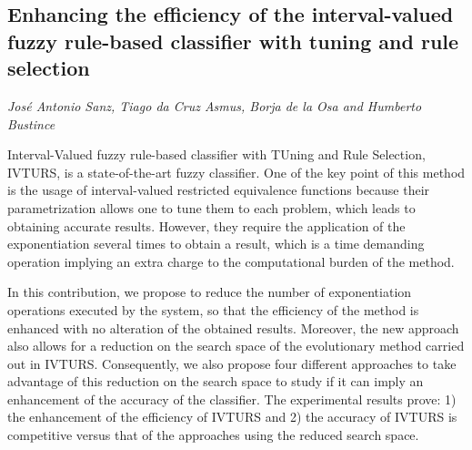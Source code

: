 \documentclass[../booklet.tex]{subfiles}
\begin{document}
\subsection[Enhancing the efficiency of the interval-valued fuzzy rule-based classifier with tuning and rule selection. {\it José Antonio Sanz, Tiago da Cruz Asmus, Borja de la Osa and Humberto Bustince}]{Enhancing the efficiency of the interval-valued fuzzy rule-based classifier with tuning and rule selection}
   

\begin{center}
  {\it José Antonio Sanz, Tiago da Cruz Asmus, Borja de la Osa and Humberto Bustince}
\end{center}

\vskip 0.8cm



Interval-Valued fuzzy rule-based classifier with TUning and Rule Selection, IVTURS, is a state-of-the-art fuzzy classifier.  One of the key point of this method is the usage of interval-valued restricted equivalence functions because their parametrization allows one to tune them to each problem, which leads to obtaining accurate results. However, they require the application of the exponentiation several times to obtain a result, which is a time demanding operation implying an extra charge to the computational burden of the method. 

In this contribution, we propose to reduce the number of exponentiation operations executed by the system, so that the efficiency of the method is enhanced with no alteration of the obtained results. Moreover, the new approach also allows for a reduction on the search space of the evolutionary method carried out in IVTURS. Consequently, we also propose four different approaches to take advantage of this reduction on the search space to study if it can imply an enhancement of the accuracy of the classifier. The experimental results prove: 1) the enhancement of the efficiency of IVTURS and 2) the accuracy of IVTURS is competitive versus that of the approaches using the reduced search space.



\end{document}
